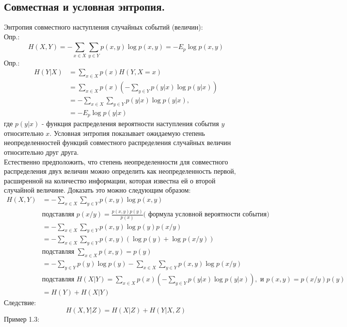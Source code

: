 \documentclass[12pt,a4paper]{scrartcl}
\begin{document}
	\subsection{Совместная и условная энтропия.}
	Энтропия совместного наступления случайных событий (величин):\\
	Опр.:
	\begin{equation}
	H(X, Y) = - \sum_{x \in X}^{}\sum_{y \in Y}^{}p(x, y)\log{p(x, y)} = - E_ p \log {p(x ,y)}
	\end{equation}
	Опр.:\\
	\begin{equation}
	\begin{split}
	H(Y|X)  & = \sum_{x \in X}^{} p(x) H(Y, X=x)\\
			& = \sum_{x \in X}^{} p(x) (- \sum_{y \in Y}^{} p(y|x) \log{p(y|x)} )\\
			& = -\sum_{x \in X}^{} \sum_{y \in Y}^{} p(y|x) \log p(y|x),\\
			& = -E_p \log{p(y|x)}
	\end{split}
	\end{equation}
	где $p(y|x)$ - функция распределения вероятности наступления события $y$ относительно $x$.
	Условная энтропия показывает ожидаемую степень неопределенностей функций совместного распределения случайных величин относительно друг друга.\\
	Естественно предположить, что степень неопределенности для совместного распределения двух величин можно определить как неопределенность первой, расширенной на количество информации, которая известна ей о второй случайной величине. Доказать это можно следующим образом:
	\[
	\begin{split}
	H(X, Y) & = -\sum_{x \in X}^{} \sum_{y \in Y}^{} p(x, y) \log{p(x, y)} \\
			& \text{подставляя } p(x/y) = \frac{p(x, y)p(y)}{p(x)} \text{( формула условной вероятности события)} \\
			& = -\sum_{x \in X}^{} \sum_{y \in Y}^{} p(x, y) \log{p(y) p(x/y)} \\
			& = -\sum_{x \in X}^{} \sum_{y \in Y}^{} p(x, y) ( \log{p(y)} + \log { p(x/y) } )\\
			& \text{подставляя } \sum_{x \in X}^{} p(x, y) = p(y) \\
			& = - \sum_{y \in Y}^{} p(y) \log{p(y)} - \sum_{x \in X}^{} \sum_{y \in Y}^{} p(x, y) \log { p(x/y) } \\
			& \text{подставляя } H(X|Y) =  \sum_{x \in X}^{} p(x)(- \sum_{y \in Y}^{} p(y|x) \log{p(y|x)} ),  \text{	и }  p(x, y) = p(x/y) p(y)\\
			& = H(Y) + H(X|Y)
	\end{split}
	\]
	Следствие:
	\[
	H(X, Y|Z) = H(X|Z) + H(Y|X,Z)
	\]
	Пример 1.3:\\
\end{document}
